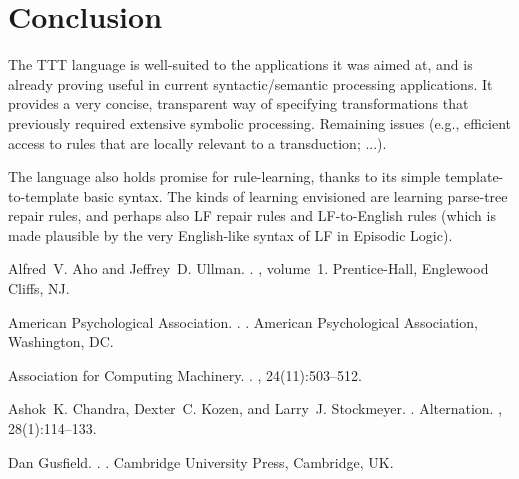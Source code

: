 \documentclass[11pt]{article}
\begin{document}
\section{Conclusion}
The TTT language is well-suited to the applications it was aimed at,
and is already proving useful in current syntactic/semantic
processing applications. It provides a very concise, transparent
way of specifying transformations that previously required
extensive symbolic processing. Remaining issues (e.g., efficient access
to rules that are locally relevant to a transduction; ...).

The language also holds promise for rule-learning, thanks to its simple 
template-to-template basic syntax. The kinds of learning envisioned
are learning parse-tree repair rules, and perhaps also LF repair
rules and LF-to-English rules (which is made plausible by the
very English-like syntax of LF in Episodic Logic).


\begin{thebibliography}{}

Alfred~V. Aho and Jeffrey~D. Ullman.
.
, volume~1.
\newblock Prentice-{Hall}, Englewood Cliffs, NJ.

{American Psychological Association}.
.
.
\newblock American Psychological Association, Washington, DC.

{Association for Computing Machinery}.
.
, 24(11):503--512.

Ashok~K. Chandra, Dexter~C. Kozen, and Larry~J. Stockmeyer.
.
\newblock Alternation.
,
  28(1):114--133.

Dan Gusfield.
.
.
\newblock Cambridge University Press, Cambridge, UK.

\end{thebibliography}
\end{document}
